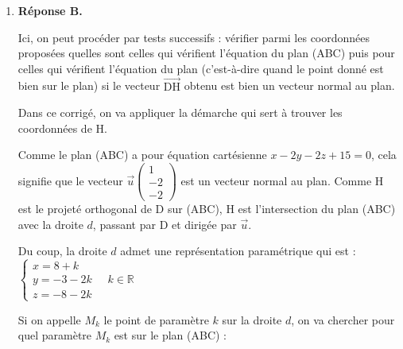 \documentclass[10pt]{article}
\providecommand{\R}{\mathbb{R}}
\providecommand{\vect}[1]{\overrightarrow{#1}}
\begin{document}
\begin{enumerate}
Pour la proposition \textbf{b.}, les coordonnées de C et de D ne vérifient pas l'équation.

Pour la proposition \textbf{d.}, aucunes des coordonnées des points B, C et D ne vérifient pas l'équation.

Par contre, pour l'équation de la proposition \textbf{c.}, on a :

$4 x_\mathrm{B}+y_\mathrm{B}+z_\mathrm{B}-21=4\times 3 + 6 + 3 - 21 = 12 + 9 - 21 =0$ donc B appartient à ce plan.

$4 x_\mathrm{C}+y_\mathrm{C}+z_\mathrm{C}-21=4\times 3 + 0 + 9 - 21 = 12 + 9 -21 =0$ donc C appartient à ce plan.

$4 x_\mathrm{D}+y_\mathrm{D}+z_\mathrm{D}-21=4\times 8 - 3 - 8 - 21 = 32 - 11 - 21 = 0$ donc D appartient à ce plan.

Ainsi, l'équation de la proposition \textbf{c.} décrit un plan qui contient les points B, C et D : c'est le plan (BCD).

	\item \textbf{Réponse B.}

Ici, on peut procéder par tests successifs : vérifier parmi les coordonnées proposées quelles sont celles qui vérifient l'équation du plan (ABC) puis pour celles qui vérifient l'équation du plan (c'est-à-dire quand le point donné est bien sur le plan) si le vecteur $\vect{\mathrm{DH}}$ obtenu est bien un vecteur normal au plan.

Dans ce corrigé, on va appliquer la démarche qui sert à trouver les coordonnées de H.

Comme le plan (ABC) a pour équation cartésienne $x-2 y-2 z+15=0$, cela signifie que le vecteur $\vect{u} \begin{pmatrix}1\\-2\\-2\end{pmatrix}$ est un vecteur normal au plan. Comme H est le projeté orthogonal de D sur (ABC), H est l'intersection du plan (ABC) avec la droite $d$, passant par D et dirigée par $\vect{u}$.

Du coup, la droite $d$ admet une représentation paramétrique qui est : $\left\{\begin{array}{l} x=8+k\\y=-3-2k\\z=-8-2k \end{array}\right. \quad k \in \R$

Si on appelle $M_k$ le point de paramètre $k$ sur la droite $d$, on va chercher pour quel paramètre $M_k$ est sur le plan (ABC) :


\end{enumerate}
\end{document}
